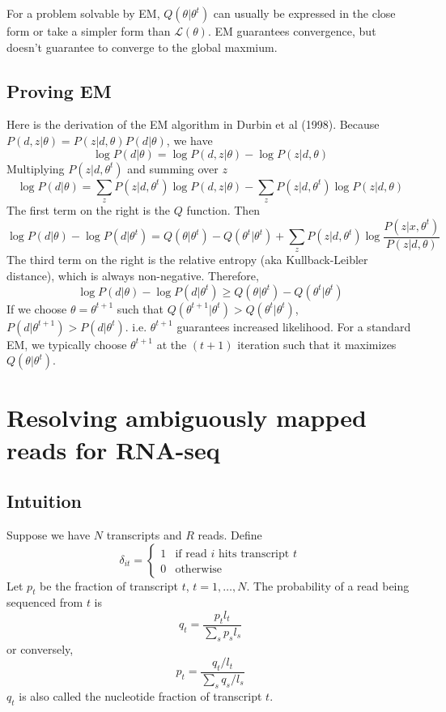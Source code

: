 \documentclass[10pt]{article}
\begin{document}
For a problem solvable by EM, $Q(\theta|\theta^t)$ can usually be expressed in
the close form or take a simpler form than $\mathcal{L}(\theta)$. EM guarantees
convergence, but doesn't guarantee to converge to the global maxmium.

\subsection{Proving EM}

Here is the derivation of the EM algorithm in Durbin et al (1998). Because
$P(d,z|\theta)=P(z|d,\theta)P(d|\theta)$, we have
$$
\log P(d|\theta)=\log P(d,z|\theta)-\log P(z|d,\theta)
$$
Multiplying $P(z|d,\theta^t)$ and summing over $z$
$$
\log P(d|\theta)=\sum_zP(z|d,\theta^t)\log P(d,z|\theta) - \sum_zP(z|d,\theta^t)\log P(z|d,\theta)
$$
The first term on the right is the $Q$ function. Then
$$
\log P(d|\theta)-\log P(d|\theta^t)=Q(\theta|\theta^t)-Q(\theta^t|\theta^t)+\sum_z P(z|d,\theta^t)\log\frac{P(z|x,\theta^t)}{P(z|d,\theta)}
$$
The third term on the right is the relative entropy (aka Kullback-Leibler
distance), which is always non-negative. Therefore,
$$
\log P(d|\theta)-\log P(d|\theta^t)\ge Q(\theta|\theta^t)-Q(\theta^t|\theta^t)
$$
If we choose $\theta=\theta^{t+1}$ such that
$Q(\theta^{t+1}|\theta^t)>Q(\theta^t|\theta^t)$,
$P(d|\theta^{t+1})>P(d|\theta^t)$. i.e. $\theta^{t+1}$ guarantees increased
likelihood. For a standard EM, we typically choose $\theta^{t+1}$ at the $(t+1)$
iteration such that it maximizes $Q(\theta|\theta^t)$.

\section{Resolving ambiguously mapped reads for RNA-seq}

\subsection{Intuition}
Suppose we have $N$ transcripts and $R$ reads.
Define
$$
\delta_{it}=\left\{\begin{array}{ll}
1 & \mbox{if read $i$ hits transcript $t$} \\
0 & \mbox{otherwise}
\end{array}\right.
$$
Let $p_t$ be the fraction of transcript $t$, $t=1,\ldots,N$.
The probability of a read being sequenced from $t$ is
\begin{equation}\label{eq:p2q}
q_t=\frac{p_tl_t}{\sum_s{p_sl_s}}
\end{equation}
or conversely,
\begin{equation}\label{eq:q2p}
p_t=\frac{q_t/l_t}{\sum_s q_s/l_s}
\end{equation}
$q_t$ is also called the nucleotide fraction of transcript $t$.
\end{document}
